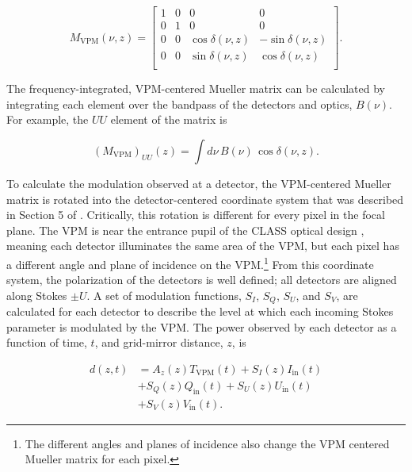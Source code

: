 \documentclass[twocolumn, tighten, numberedappendix, twocolappendix]{aastex63}
\begin{document}
\begin{equation}
M_\mathrm{VPM}(\nu,z) = \begin{bmatrix}
1 & 0 & 0 & 0 \\
0 & 1 & 0 & 0 \\
0 & 0 & \cos \delta(\nu,z)& -\sin \delta(\nu,z) \\
0 & 0 & \sin \delta(\nu,z) & \cos \delta(\nu,z) \\
\end{bmatrix}.
\end{equation}

\noindent The frequency-integrated, VPM-centered Mueller matrix can be calculated by integrating each element over the bandpass of the detectors and optics, $B(\nu)$. For example, the $UU$ element of the matrix is

\begin{equation}
(M_\mathrm{VPM})_{UU}(z) = \int d\nu \, B(\nu) \,  \cos \delta(\nu, z). 
\end{equation}


To calculate the modulation observed at a detector, the VPM-centered Mueller matrix is rotated into the detector-centered coordinate system that was described in Section 5 of \cite{xu20}. Critically, this rotation is different for every pixel in the focal plane. The VPM is near the entrance pupil of the CLASS optical design \citep{eime12}, meaning each detector illuminates the same area of the VPM, but each pixel has a different angle and plane of incidence on the VPM.\footnote{The different angles and planes of incidence also change the VPM centered Mueller matrix for each pixel.} From this coordinate system, the polarization of the detectors is well defined; all detectors are aligned along Stokes $\pm U$. A set of modulation functions, $S_{I}$, $S_{Q}$, $S_{U}$, and $S_{V}$, are calculated for each detector to describe the level at which each incoming Stokes parameter is modulated by the VPM. The power observed by each detector as a function of time, $t$, and grid-mirror distance, $z$, is

\begin{equation}
\begin{aligned}
    d(z,t) &= A_{z}(z)T_\mathrm{VPM}(t) 
    + S_{I}(z)I_\mathrm{in}(t)\\
    &+ S_{Q}(z)Q_\mathrm{in}(t)
    + S_{U}(z)U_\mathrm{in}(t)\\
    &+ S_{V}(z)V_\mathrm{in}(t).
\end{aligned}
\label{eq:data_vec}
\end{equation}
\end{document}
